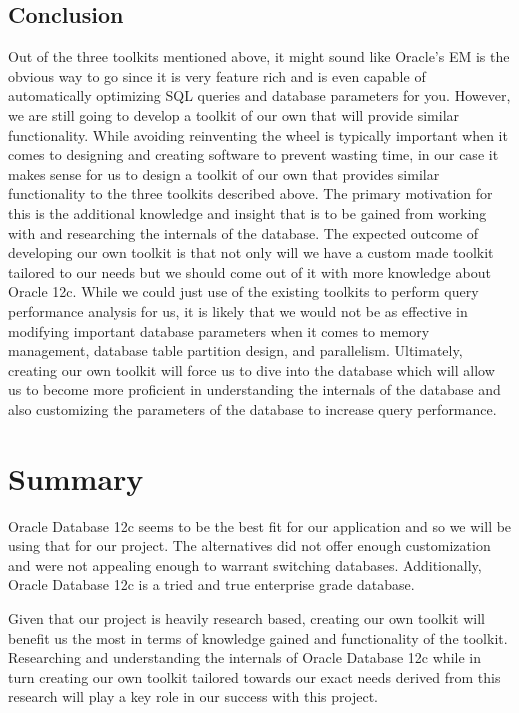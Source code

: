\documentclass[draftclsnofoot, onecolumn, compsoc, 10pt]{IEEEtran}
\begin{document}
\subsection{Conclusion}
Out of the three toolkits mentioned above, it might sound like Oracle’s EM is the obvious way to go since it is very feature rich and is even capable of automatically optimizing SQL queries and database parameters for you. 
However, we are still going to develop a toolkit of our own that will provide similar functionality. 
While avoiding reinventing the wheel is typically important when it comes to designing and creating software to prevent wasting time, in our case it makes sense for us to design a toolkit of our own that provides similar functionality to the three toolkits described above. 
The primary motivation for this is the additional knowledge and insight that is to be gained from working with and researching the internals of the database.
The expected outcome of developing our own toolkit is that not only will we have a custom made toolkit tailored to our needs but we should come out of it with more knowledge about Oracle 12c. 
While we could just use of the existing toolkits to perform query performance analysis for us, it is likely that we would not be as effective in modifying important database parameters when it comes to memory management, database table partition design, and parallelism. 
Ultimately, creating our own toolkit will force us to dive into the database which will allow us to become more proficient in understanding the internals of the database and also customizing the parameters of the database to increase query performance.

\section{Summary}
Oracle Database 12c seems to be the best fit for our application and so we will be using that for our project.
The alternatives did not offer enough customization and were not appealing enough to warrant switching databases.
Additionally, Oracle Database 12c is a tried and true enterprise grade database.

Given that our project is heavily research based, creating our own toolkit will benefit us the most in terms of knowledge gained and functionality of the toolkit. 
Researching and understanding the internals of Oracle Database 12c while in turn creating our own toolkit tailored towards our exact needs derived from this research will play a key role in our success with this project.
\end{document}
